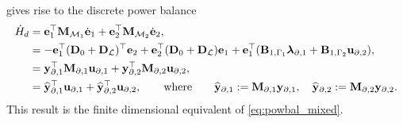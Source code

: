 gives rise to the discrete power balance
\begin{equation}
\begin{aligned}
\dot{H}_d &= \mathbf{e}_1^\top \mathbf{M}_{\mathcal{M}_1} \dot{\mathbf{e}}_1 + \mathbf{e}_2^\top \mathbf{M}_{\mathcal{M}_2} \dot{\mathbf{e}}_2, \\
&= -\mathbf{e}_1^\top (\mathbf{D}_0+\mathbf{D}_\mathcal{L})^\top {\mathbf{e}}_2 + \mathbf{e}_2^\top (\mathbf{D}_0+\mathbf{D}_\mathcal{L}) {\mathbf{e}}_1 + \mathbf{e}_1^\top (\mathbf{B}_{1, \Gamma_1} \bm{\lambda}_{\partial, 1} + \mathbf{B}_{1, \Gamma_2} \mathbf{u}_{\partial, 2} ), \\
&= \mathbf{y}_{\partial, 1}^\top \mathbf{M}_{\partial, 1} \mathbf{u}_{\partial, 1} + \mathbf{y}_{\partial, 2}^\top \mathbf{M}_{\partial, 2} \mathbf{u}_{\partial, 2}, \\
&= \widehat{\mathbf{y}}_{\partial, 1}^\top \mathbf{u}_{\partial, 1} + \widehat{\mathbf{y}}_{\partial, 2}^\top \mathbf{u}_{\partial, 2}, \qquad \text{where} \qquad \widehat{\mathbf{y}}_{\partial, 1} :=\mathbf{M}_{\partial, 1} \mathbf{y}_{\partial, 1}, \quad \widehat{\mathbf{y}}_{\partial, 2} :=\mathbf{M}_{\partial, 2} \mathbf{y}_{\partial, 2}.
\end{aligned}
\end{equation}
This result is the finite dimensional equivalent of \eqref{eq:powbal_mixed}.

